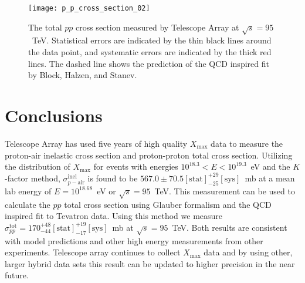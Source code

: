 \documentclass[12pt]{article}
\newcommand{\xm}{$X_{\mathrm{max}}$}
\newcommand{\spairinel}{$\sigma_{p-\mathrm{air}}^{\mathrm{inel}}$}
\begin{document}
\begin{figure}
  \centering
  \texttt{[image: p\_p\_cross\_section\_02]}
  \caption{The total $pp$ cross section measured by Telescope Array at
    $\sqrt{s} = 95$~TeV. Statistical errors are indicated by the thin
    black lines around the data point, and systematic errors are indicated
    by the thick red lines. The dashed line shows the prediction of
    the QCD inspired fit by Block, Halzen, and Stanev.}
  \label{fig:p_p_cross_section}
\end{figure}

\section{Conclusions}
Telescope Array has used five years of high quality \xm{} data to
measure the proton-air inelastic cross section and proton-proton total
cross section. Utilizing the distribution of \xm{} for events with
energies $10^{18.3} < E < 10^{19.3}$~eV and the $K$-factor method,
\spairinel{} is found to be $567.0 \pm
70.5[\mathrm{stat}]^{+29}_{-25}[\mathrm{sys}]$~mb at a mean lab energy
of $E = 10^{18.68}$~eV or $\sqrt{s} = 95$~TeV. This measurement can be
used to calculate the $pp$ total cross section using Glauber formalism
and the QCD inspired fit to Tevatron data. Using this method we
measure $\sigma_{pp}^{\mathrm{tot}} =
170^{+48}_{-44}[\mathrm{stat}]^{+19}_{-17}[\mathrm{sys}]$~mb at
$\sqrt{s} = 95$~TeV. Both results are consistent with model
predictions and other high energy measurements from other
experiments. Telescope array continues to collect \xm{} data and by
using other, larger hybrid data sets this result can be updated to
higher precision in the near future.

\printbibliography
\end{document}
